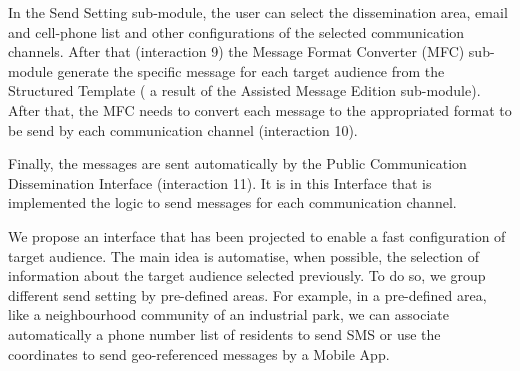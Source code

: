 In the Send Setting sub-module, the user can select the dissemination area, email and cell-phone list and other configurations of the selected communication channels. After that (interaction 9) the Message Format Converter (MFC) sub-module generate the specific message for each target audience from the Structured Template ( a result of the Assisted Message Edition sub-module).  After that, the MFC needs to convert each message to the appropriated format to be send by each communication channel (interaction 10). 

Finally, the messages are sent automatically by the Public Communication Dissemination Interface (interaction 11). It is in this Interface that is implemented the logic to send messages for each communication channel. 

We propose an interface that has been projected to enable a fast configuration of target audience. The main idea is automatise, when possible, the selection of information about the target audience selected previously. To do so, we group different send setting by pre-defined areas. For example, in a pre-defined area, like a neighbourhood community of an industrial park, we can associate automatically a phone number list of residents to send SMS or use the coordinates to send geo-referenced messages by a Mobile App.

